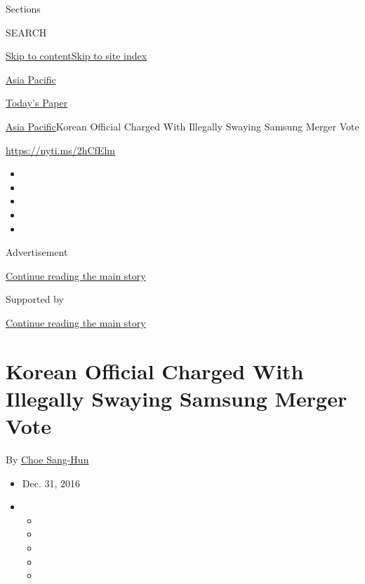 Sections

SEARCH

\protect\hyperlink{site-content}{Skip to
content}\protect\hyperlink{site-index}{Skip to site index}

\href{https://www.nytimes.com/section/world/asia}{Asia Pacific}

\href{https://myaccount.nytimes.com/auth/login?response_type=cookie\&client_id=vi}{}

\href{https://www.nytimes.com/section/todayspaper}{Today's Paper}

\href{/section/world/asia}{Asia Pacific}\textbar{}Korean Official
Charged With Illegally Swaying Samsung Merger Vote

\url{https://nyti.ms/2hCfElm}

\begin{itemize}
\item
\item
\item
\item
\item
\end{itemize}

Advertisement

\protect\hyperlink{after-top}{Continue reading the main story}

Supported by

\protect\hyperlink{after-sponsor}{Continue reading the main story}

\hypertarget{korean-official-charged-with-illegally-swaying-samsung-merger-vote}{%
\section{Korean Official Charged With Illegally Swaying Samsung Merger
Vote}\label{korean-official-charged-with-illegally-swaying-samsung-merger-vote}}

By \href{http://www.nytimes.com/by/choe-sang-hun}{Choe Sang-Hun}

\begin{itemize}
\item
  Dec. 31, 2016
\item
  \begin{itemize}
  \item
  \item
  \item
  \item
  \item
  \end{itemize}
\end{itemize}

